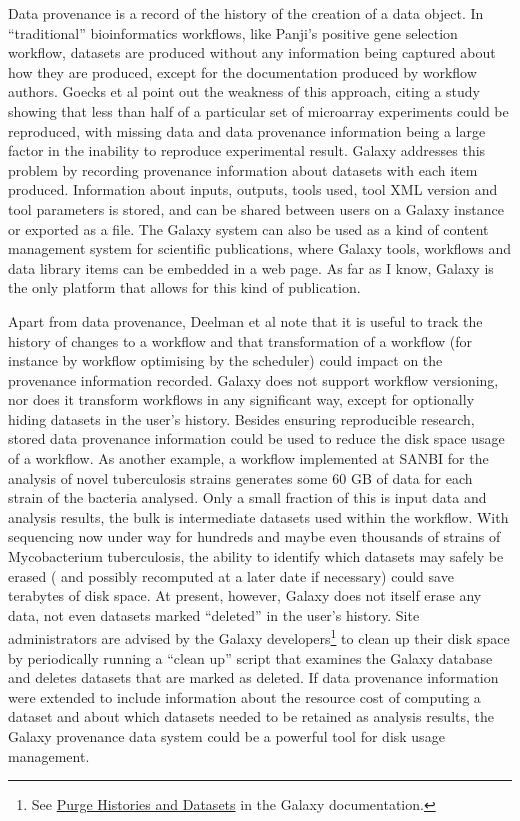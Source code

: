 \documentclass[a4paper,10pt]{scrreprt} \usepackage[utf8]{inputenc}
\begin{document}
Data provenance is a record of the history of the creation of a data object. In ``traditional'' bioinformatics workflows, like Panji's positive gene selection workflow, datasets are produced without any information being captured about how they are produced, except for the documentation produced by workflow authors. Goecks et al point out the weakness of this approach, citing a study showing that less than half of a particular set of microarray experiments could be reproduced, with missing data and data provenance information being a large factor in the inability to reproduce experimental result. Galaxy addresses this problem by recording provenance information about datasets with each item produced. Information about inputs, outputs, tools used, tool XML version and tool parameters is stored, and can be shared between users on a Galaxy instance or exported as a file. The Galaxy system can also be used as a kind of content management system for scientific publications, where Galaxy tools, workflows and data 
library items can be embedded in a web page. As far as I know, Galaxy is the only platform that allows for this kind of publication.

Apart from data provenance, Deelman et al note that it is useful to track the history of changes to a workflow and that transformation of a workflow (for instance by workflow optimising by the scheduler) could impact on the provenance information recorded. Galaxy does not support workflow versioning, nor does it transform workflows in any significant way, except for optionally hiding datasets in the user's history. Besides ensuring reproducible research, stored data provenance information could be used to reduce the disk space usage of a workflow. As another example, a workflow implemented at SANBI for the analysis of novel tuberculosis strains generates some 60 GB of data for each strain of the bacteria analysed. Only a small fraction of this is input data and analysis results, the bulk is intermediate datasets used within the workflow. With sequencing now under way for hundreds and maybe even thousands of strains of Mycobacterium tuberculosis, the ability to identify which datasets may safely be erased (
and possibly recomputed at a later date if necessary) could save terabytes of disk space. At present, however, Galaxy does not itself erase any data, not even datasets marked ``deleted'' in the user's history. Site administrators are advised by the Galaxy developers\footnote{See \href{http://wiki.g2.bx.psu.edu/Admin/Config/Performance/Purge\%20Histories\%20and\%20Datasets}{Purge Histories and Datasets} in the Galaxy documentation.} to clean up their disk space by periodically running a ``clean up'' script that examines the Galaxy database and deletes datasets that are marked as deleted. If data provenance information were extended to include information about the resource cost of computing a dataset and about which datasets needed to be retained as analysis results, the Galaxy provenance data system could be a powerful tool for disk usage management.
\end{document}
